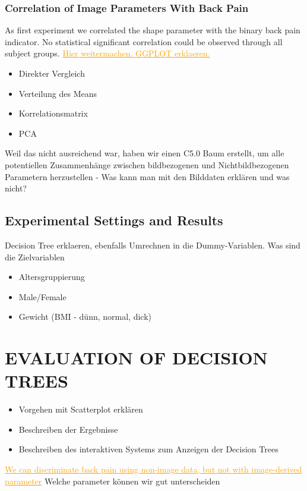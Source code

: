 \documentclass[a4paper,twoside]{style/article}
\newcommand{\com}[1]{\textcolor{orange}{\uline{#1}}}
\begin{document}
\subsubsection{Correlation of Image Parameters With Back Pain}
As first experiment we correlated the shape parameter with the binary back pain indicator.
No statistical significant correlation could be observed through all subject groups.
\com{Hier weitermachen. GGPLOT erklaeren.}

\begin{itemize}
	\item Direkter Vergleich
	\item Verteilung des Means
	\item Korrelationsmatrix
	\item PCA
\end{itemize}
Weil das nicht ausreichend war, haben wir einen C5.0 Baum erstellt, um alle potentiellen Zusammenhänge zwischen bildbezogenen und Nichtbildbezogenen Parametern herzustellen - Was kann man mit den Bilddaten erklären und was nicht?

\subsection{Experimental Settings and Results}
Decision Tree erklaeren, ebenfalls Umrechnen in die Dummy-Variablen. Was sind die Zielvariablen
\begin{itemize}
\item Altersgruppierung
\item Male/Female
\item Gewicht (BMI - dünn, normal, dick)
\end{itemize}


\section{\uppercase{Evaluation of Decision Trees}}
\label{sec:Experiments}
\begin{itemize}
\item Vorgehen mit Scatterplot erklären
\item Beschreiben der Ergebnisse
\item Beschreiben des interaktiven Systems zum Anzeigen der Decision Trees
\end{itemize}

\com{We can discriminate back pain using non-image data, but not with image-derived parameter}
Welche parameter können wir gut unterscheiden
\end{document}
